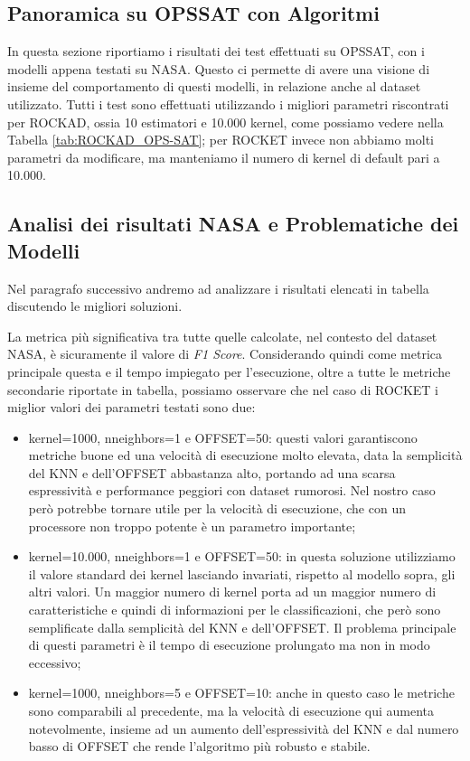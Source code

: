 \subsection{Panoramica su OPS\textunderscore SAT con Algoritmi}
In questa sezione riportiamo i risultati dei test effettuati su OPS\textunderscore SAT, con i modelli appena testati su NASA.
Questo ci permette di avere una visione di insieme del comportamento di questi modelli, in relazione anche al dataset utilizzato.
Tutti i test sono effettuati utilizzando i migliori parametri riscontrati per ROCKAD, ossia 10 estimatori e 10.000 kernel, come possiamo vedere nella Tabella \ref{tab:ROCKAD_OPS-SAT}; per ROCKET invece non abbiamo molti parametri da modificare, ma manteniamo il numero di kernel di default pari a 10.000.



\subsection{Analisi dei risultati NASA e Problematiche dei Modelli}
Nel paragrafo successivo andremo ad analizzare i risultati elencati in tabella discutendo le migliori soluzioni.

La metrica più significativa tra tutte quelle calcolate, nel contesto del dataset NASA, è sicuramente il valore di \textit{F1 Score}.
Considerando quindi come metrica principale questa e il tempo impiegato per l'esecuzione, oltre a tutte le metriche secondarie riportate in tabella, possiamo osservare che nel caso di ROCKET i miglior valori dei parametri testati sono due:
\begin{itemize}
    \item  kernel=1000, n\textunderscore neighbors=1 e OFFSET=50: questi valori garantiscono metriche buone ed una velocità di esecuzione molto elevata, data la semplicità del KNN e dell'OFFSET abbastanza alto, portando ad una scarsa espressività e performance peggiori con dataset rumorosi. Nel nostro caso però potrebbe tornare utile per la velocità di esecuzione, che con un processore non troppo potente è un parametro importante;
    \item  kernel=10.000, n\textunderscore neighbors=1 e OFFSET=50: in questa soluzione utilizziamo il valore standard dei kernel lasciando invariati, rispetto al modello sopra, gli altri valori. Un maggior numero di kernel porta ad un maggior numero di caratteristiche e quindi di informazioni per le classificazioni, che però sono semplificate dalla semplicità del KNN e dell'OFFSET. Il problema principale di questi parametri è il tempo di esecuzione prolungato ma non in modo eccessivo;
    \item kernel=1000, n\textunderscore neighbors=5 e OFFSET=10: anche in questo caso le metriche sono comparabili al precedente, ma la velocità di esecuzione qui aumenta notevolmente, insieme ad un aumento dell'espressività del KNN e dal numero basso di OFFSET che rende l'algoritmo più robusto e stabile.
\end{itemize}


